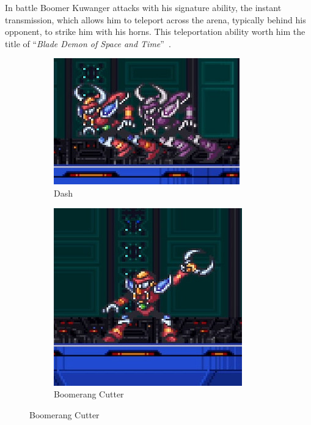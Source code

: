 In battle Boomer Kuwanger attacks with his signature ability, the instant transmission, which allows him to teleport across the arena, typically behind his opponent, to strike him with his horns. This teleportation ability worth him the title of  ``\textit{Blade Demon of Space and Time}''~\cite{book:MMX_Complete_art}. 
\begin{figure}[htp]
	\centering
	\begin{subfigure}{0.41\linewidth}
		\centering
		\includegraphics[width=\linewidth]{figures/X1/Boomer_kuwanger/Boomer_dash.jpg}
		\caption{Dash}
	\end{subfigure}
	\begin{subfigure}{0.3\linewidth}
		\centering
		\includegraphics[width=\linewidth]{figures/X1/Boomer_kuwanger/Boomer_throw.jpg}
		\caption{Boomerang Cutter}
	\end{subfigure}
	
\end{figure}
